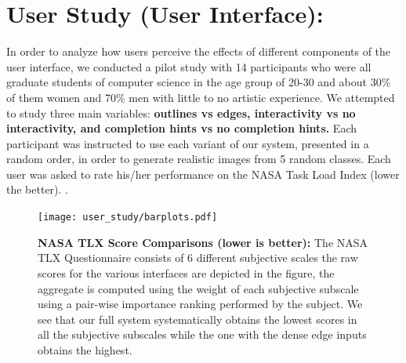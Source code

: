 \section{User Study (User Interface):}
In order to analyze how users perceive the effects of different components of the user interface, we conducted a pilot study with 14 participants who were all graduate students of computer science in the age group of 20-30 and about 30\% of them women and 70\% men with little to no artistic experience. 
We attempted to study three main variables: \textbf{outlines vs edges, interactivity vs no interactivity, and completion hints vs no completion hints.} 
Each participant was instructed to use each variant of our system, presented in a random order, in order to generate realistic images from 5 random classes. 
Each user was asked to rate his/her performance on the NASA Task Load Index (lower the better). \cite{hart1988development}. 


\begin{figure}[t]
    \centering
    \texttt{[image: user\_study/barplots.pdf]}
    \caption{{\bf NASA TLX Score Comparisons (lower is better): }
    The NASA TLX Questionnaire consists of 6 different subjective scales the raw scores for the various interfaces are depicted in the figure, the aggregate is computed using the weight of each subjective subscale using a pair-wise importance ranking performed by the subject. We see that our full system systematically obtains the lowest scores in all the subjective subscales while the one with the dense edge inputs obtains the highest.\label{fig:nasa-tlx}
    \vspace{-2mm}
    }
    \vspace{-2mm}
\end{figure}

\begin{table}[h]
\end{table}

